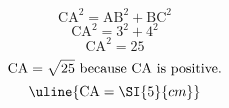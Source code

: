 \[\text{CA}^{2}=\text{AB}^{2}+\text{BC}^{2}\]
\[\text{CA}^{2}=3^{2}+4^{2}\]
\[\text{CA}^{2}=25\]
\[\text{CA}=\sqrt{\mathstrut 25}\text{ because CA is positive.}\]
\[\uline{\text{CA}=\SI{5}{cm}}\]
